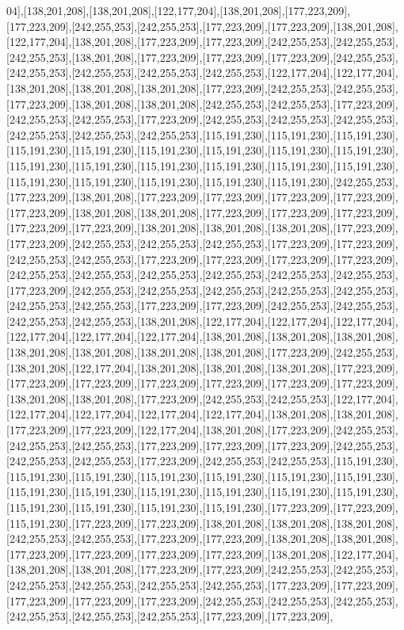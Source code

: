 04],[138,201,208],[138,201,208],[122,177,204],[138,201,208],[177,223,209],[177,223,209],[242,255,253],[242,255,253],[177,223,209],[177,223,209],[138,201,208],[122,177,204],[138,201,208],[177,223,209],[177,223,209],[242,255,253],[242,255,253],[242,255,253],[138,201,208],[177,223,209],[177,223,209],[177,223,209],[242,255,253],[242,255,253],[242,255,253],[242,255,253],[242,255,253],[122,177,204],[122,177,204],[138,201,208],[138,201,208],[138,201,208],[177,223,209],[242,255,253],[242,255,253],[177,223,209],[138,201,208],[138,201,208],[242,255,253],[242,255,253],[177,223,209],[242,255,253],[242,255,253],[177,223,209],[242,255,253],[242,255,253],[242,255,253],[242,255,253],[242,255,253],[242,255,253],[115,191,230],[115,191,230],[115,191,230],[115,191,230],[115,191,230],[115,191,230],[115,191,230],[115,191,230],[115,191,230],[115,191,230],[115,191,230],[115,191,230],[115,191,230],[115,191,230],[115,191,230],[115,191,230],[115,191,230],[115,191,230],[115,191,230],[115,191,230],[242,255,253],[177,223,209],[138,201,208],[177,223,209],[177,223,209],[177,223,209],[177,223,209],[177,223,209],[138,201,208],[138,201,208],[177,223,209],[177,223,209],[177,223,209],[177,223,209],[177,223,209],[138,201,208],[138,201,208],[138,201,208],[177,223,209],[177,223,209],[242,255,253],[242,255,253],[242,255,253],[177,223,209],[177,223,209],[242,255,253],[242,255,253],[177,223,209],[177,223,209],[177,223,209],[177,223,209],[242,255,253],[242,255,253],[242,255,253],[242,255,253],[242,255,253],[242,255,253],[177,223,209],[242,255,253],[242,255,253],[242,255,253],[242,255,253],[242,255,253],[242,255,253],[242,255,253],[177,223,209],[177,223,209],[242,255,253],[242,255,253],[242,255,253],[242,255,253],[138,201,208],[122,177,204],[122,177,204],[122,177,204],[122,177,204],[122,177,204],[122,177,204],[138,201,208],[138,201,208],[138,201,208],[138,201,208],[138,201,208],[138,201,208],[138,201,208],[177,223,209],[242,255,253],[138,201,208],[122,177,204],[138,201,208],[138,201,208],[138,201,208],[177,223,209],[177,223,209],[177,223,209],[177,223,209],[177,223,209],[177,223,209],[177,223,209],[138,201,208],[138,201,208],[177,223,209],[242,255,253],[242,255,253],[122,177,204],[122,177,204],[122,177,204],[122,177,204],[122,177,204],[138,201,208],[138,201,208],[177,223,209],[177,223,209],[122,177,204],[138,201,208],[177,223,209],[242,255,253],[242,255,253],[242,255,253],[177,223,209],[177,223,209],[177,223,209],[242,255,253],[242,255,253],[242,255,253],[177,223,209],[242,255,253],[242,255,253],[115,191,230],[115,191,230],[115,191,230],[115,191,230],[115,191,230],[115,191,230],[115,191,230],[115,191,230],[115,191,230],[115,191,230],[115,191,230],[115,191,230],[115,191,230],[115,191,230],[115,191,230],[115,191,230],[115,191,230],[177,223,209],[177,223,209],[115,191,230],[177,223,209],[177,223,209],[138,201,208],[138,201,208],[138,201,208],[242,255,253],[242,255,253],[177,223,209],[177,223,209],[138,201,208],[138,201,208],[177,223,209],[177,223,209],[177,223,209],[177,223,209],[138,201,208],[122,177,204],[138,201,208],[138,201,208],[177,223,209],[177,223,209],[242,255,253],[242,255,253],[242,255,253],[242,255,253],[242,255,253],[242,255,253],[177,223,209],[177,223,209],[177,223,209],[177,223,209],[177,223,209],[242,255,253],[242,255,253],[242,255,253],[242,255,253],[242,255,253],[242,255,253],[177,223,209],[177,223,209],